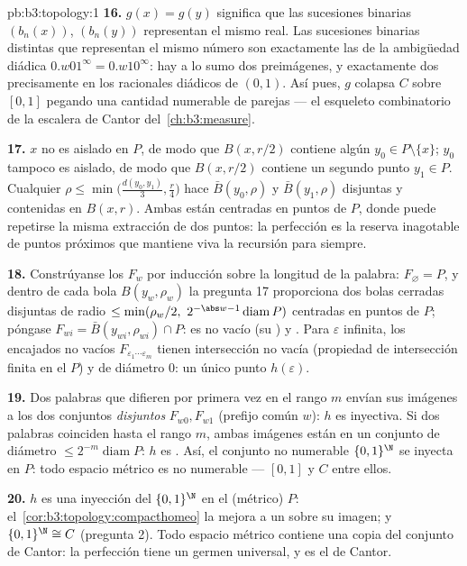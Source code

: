 \begin{solution}{pb:b3:topology:1}
\textbf{16.} $g(x) = g(y)$ significa que las sucesiones binarias
$(b_n(x))$, $(b_n(y))$ representan el mismo real. Las sucesiones
binarias distintas que representan el mismo número son exactamente las
de la ambigüedad diádica $0.w01^\infty = 0.w10^\infty$: hay a lo sumo
dos preimágenes, y exactamente dos precisamente en los racionales
diádicos de $(0,1)$. Así pues, $g$ colapsa $C$ sobre $[0,1]$ pegando una
cantidad numerable de parejas --- el esqueleto combinatorio de la
escalera de Cantor del~\cref{ch:b3:measure}.

\textbf{17.} $x$ no es aislado en $P$, de modo que $B(x, r/2)$ contiene
algún $y_0 \in P \setminus \{x\}$; $y_0$ tampoco es aislado, de modo que
$B(x, r/2)$ contiene un segundo punto $y_1
\in P$. Cualquier $\rho \leq \min\bigl(\frac{d(y_0,y_1)}3,
\frac r4\bigr)$ hace $\bar B(y_0, \rho)$ y $\bar B(y_1,
\rho)$ disjuntas y contenidas en $B(x, r)$. Ambas están centradas en
puntos de $P$, donde puede repetirse la misma extracción de dos puntos:
la perfección es la reserva inagotable de puntos próximos que mantiene
viva la recursión para siempre.

\textbf{18.} Constrúyanse los $F_w$ por inducción sobre la longitud de
la palabra: $F_\varnothing = P$, y dentro de cada bola $B(y_w, \rho_w)$
la pregunta 17 proporciona dos bolas cerradas disjuntas de radio $\leq
\min(\rho_w/2,\ 2^{-\abs w-1}\operatorname{diam}P)$ centradas en puntos
de $P$; póngase $F_{wi} = \bar B(y_{wi}, \rho_{wi})
\cap P$: es no vacío (su ) y
. Para $\varepsilon$ infinita,
los  encajados no vacíos
$F_{\varepsilon_1\cdots\varepsilon_m}$ tienen intersección no vacía
(propiedad de intersección finita en el
 $P$) y de diámetro $0$: un
único punto $h(\varepsilon)$.

\textbf{19.} Dos palabras que difieren por primera vez en el rango $m$
envían sus imágenes a los dos conjuntos \emph{disjuntos}
$F_{w0}, F_{w1}$ (prefijo común $w$): $h$ es inyectiva. Si dos palabras
coinciden hasta el rango $m$, ambas imágenes están en un conjunto de
diámetro $\leq
2^{-m}\operatorname{diam}P$: $h$ es
. Así, el conjunto no
numerable $\{0,1\}^\N$ se inyecta en $P$: todo espacio métrico
 es no numerable --- $[0,1]$ y
$C$ entre ellos.

\textbf{20.} $h$ es una inyección
 del
 $\{0,1\}^\N$ en el
 (métrico) $P$:
el~\cref{cor:b3:topology:compacthomeo} la mejora a un
 sobre su imagen; y
$\{0,1\}^\N \cong C$ (pregunta 2). Todo espacio métrico
 contiene una copia del
conjunto de Cantor: la perfección tiene un germen universal, y es el de
Cantor.


\end{solution}
